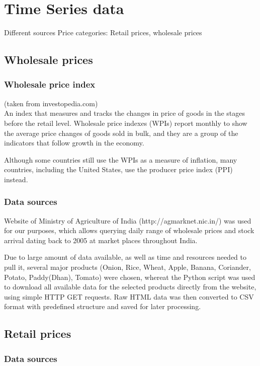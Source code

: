 \section*{Time Series data}

Different sources
Price categories: Retail prices, wholesale prices

\subsection*{Wholesale prices}

\subsubsection*{Wholesale price index}
(taken from investopedia.com)\\
An index that measures and tracks the changes in price of goods in the stages before the retail level. Wholesale price indexes (WPIs) report monthly to show the average price changes of goods sold in bulk, and they are a group of the indicators that follow growth in the economy.\par
Although some countries still use the WPIs as a measure of inflation, many countries, including the United States, use the producer price index (PPI) instead.\par

\subsubsection*{Data sources}
Website of Ministry of Agriculture of India (http://agmarknet.nic.in/) was used for our purposes, which allows querying daily range of wholesale prices and stock arrival dating back to 2005 at market places throughout India.

Due to large amount of data available, as well as time and resources needed to pull it, several major products (Onion, Rice, Wheat, Apple, Banana, Coriander, Potato, Paddy(Dhan), Tomato) were chosen, whereat the Python script was used to download all available data for the selected products directly from the website, using simple HTTP GET requests. Raw HTML data was then converted to CSV format with predefined structure and saved for later processing.

\subsection*{Retail prices}
\subsubsection*{Data sources}

